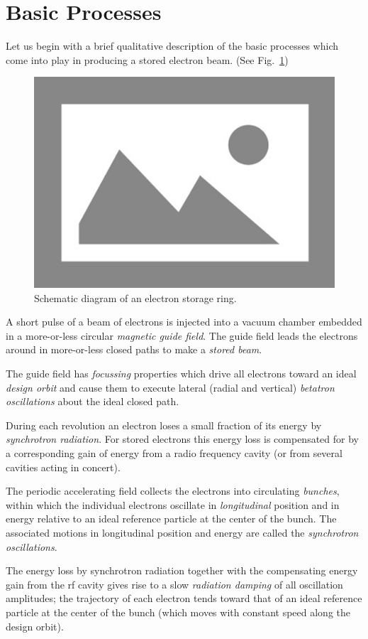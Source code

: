 \section{Basic Processes}\label{sec:1.2}

Let us begin with a brief qualitative description of the basic processes which come into play in producing a stored electron beam. (See Fig.~\ref{fig:ring})

\begin{figure}[!htb]
	\centering
	\includegraphics[width=0.6\linewidth]{./Figuras/placeholder.png}
	\caption{Schematic diagram of an electron storage ring.}
	\label{fig:ring}
\end{figure}

A short pulse of a beam of electrons is injected into a vacuum chamber embedded in a more-or-less circular \emph{magnetic guide field}. The guide field leads the electrons around in more-or-less closed paths to make a \emph{stored beam}.

The guide field has \emph{focussing} properties which drive all electrons toward an ideal \emph{design orbit} and cause them to execute lateral (radial and vertical) \emph{betatron oscillations} about the ideal closed path.

During each revolution an electron loses a small fraction of its energy by \emph{synchrotron radiation}. For stored electrons this energy loss is compensated for by a corresponding gain of energy from a radio frequency cavity (or from several cavities acting in concert).

The periodic accelerating field collects the electrons into circulating \emph{bunches}, within which the individual electrons oscillate in \emph{longitudinal} position and in energy relative to an ideal reference particle at the center of the bunch. The associated motions in longitudinal position and energy are called the \emph{synchrotron oscillations}.

The energy loss by synchrotron radiation together with the compensating energy gain from the rf cavity gives rise to a slow \emph{radiation damping} of all oscillation amplitudes; the trajectory of each electron tends toward that of an ideal reference particle at the center of the bunch (which moves with constant speed along the design orbit).

